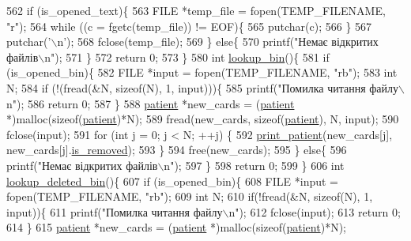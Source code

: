 \begin{DoxyCodeInclude}
{{{{{562     \textcolor{keywordflow}{if} (is\_opened\_text)\{
563         FILE *temp\_file = fopen(TEMP\_FILENAME, \textcolor{stringliteral}{"r"});
564         \textcolor{keywordflow}{while} ((c = fgetc(temp\_file)) != EOF)\{
565             putchar(c);
566         \}
567         putchar(\textcolor{charliteral}{'\(\backslash\)n'});
568         fclose(temp\_file);
569     \} \textcolor{keywordflow}{else}\{
570         printf(\textcolor{stringliteral}{"Немає відкритих файлів\(\backslash\)n"});
571     \}
572     \textcolor{keywordflow}{return} 0;
573 \}
580 \textcolor{keywordtype}{int} \hyperlink{main_8c_a9b8453d075485a7eb875466bc438ef40}{lookup\_bin}()\{
581     \textcolor{keywordflow}{if} (is\_opened\_bin)\{
582         FILE *input = fopen(TEMP\_FILENAME, \textcolor{stringliteral}{"rb"});
583         \textcolor{keywordtype}{int} N;
584         \textcolor{keywordflow}{if} (!(fread(&N, \textcolor{keyword}{sizeof}(N), 1, input)))\{
585             printf(\textcolor{stringliteral}{"Помилка читання файлу\(\backslash\)n"});
586             \textcolor{keywordflow}{return} 0;
587         \}
588         \hyperlink{structpatient__struct}{patient} *new\_cards = (\hyperlink{structpatient__struct}{patient} *)malloc(\textcolor{keyword}{sizeof}(\hyperlink{structpatient__struct}{patient})*N);
589         fread(new\_cards, \textcolor{keyword}{sizeof}(\hyperlink{structpatient__struct}{patient}), N, input);
590         fclose(input);
591         \textcolor{keywordflow}{for} (\textcolor{keywordtype}{int} j = 0; j < N; ++j) \{
592             \hyperlink{main_8c_abbf86d13b1ad7b2b758cea501fa0261a}{print\_patient}(new\_cards[j], new\_cards[j].\hyperlink{structpatient__struct_ad2475b69abfa9243c2700d63b63aa79b}{is\_removed});
593         \}
594         free(new\_cards);
595     \} \textcolor{keywordflow}{else}\{
596         printf(\textcolor{stringliteral}{"Немає відкритих файлів\(\backslash\)n"});
597     \}
598     \textcolor{keywordflow}{return} 0;
599 \}
606 \textcolor{keywordtype}{int} \hyperlink{main_8c_a176e42778dac5da0664205b3c0e2edf4}{lookup\_deleted\_bin}()\{
607     \textcolor{keywordflow}{if} (is\_opened\_bin)\{
608         FILE *input = fopen(TEMP\_FILENAME, \textcolor{stringliteral}{"rb"});
609         \textcolor{keywordtype}{int} N;
610         \textcolor{keywordflow}{if}(!fread(&N, \textcolor{keyword}{sizeof}(N), 1, input))\{
611             printf(\textcolor{stringliteral}{"Помилка читання файлу\(\backslash\)n"});
612             fclose(input);
613             \textcolor{keywordflow}{return} 0;
614         \}
615         \hyperlink{structpatient__struct}{patient} *new\_cards = (\hyperlink{structpatient__struct}{patient} *)malloc(\textcolor{keyword}{sizeof}(\hyperlink{structpatient__struct}{patient})*N);
}}}}}
\end{DoxyCodeInclude}
